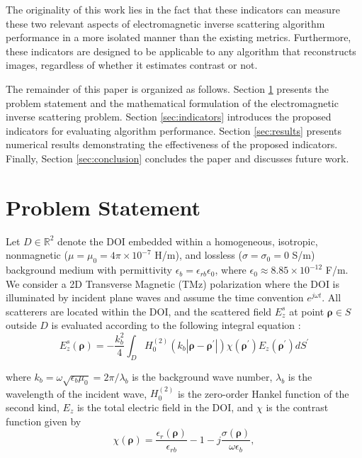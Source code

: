 \documentclass{IEEEtran}
\newcommand{\brho}{\boldsymbol{\rho}}
\newcommand{\brhop}{\boldsymbol{\rho^\prime}}
\begin{document}
        The originality of this work lies in the fact that these indicators can measure these two relevant aspects of electromagnetic inverse scattering algorithm performance in a more isolated manner than the existing metrics. Furthermore, these indicators are designed to be applicable to any algorithm that reconstructs images, regardless of whether it estimates contrast or not.

        The remainder of this paper is organized as follows. Section \ref{sec:problemstatement} presents the problem statement and the mathematical formulation of the electromagnetic inverse scattering problem. Section \ref{sec:indicators} introduces the proposed indicators for evaluating algorithm performance. Section \ref{sec:results} presents numerical results demonstrating the effectiveness of the proposed indicators. Finally, Section \ref{sec:conclusion} concludes the paper and discusses future work.
        
	\section{Problem Statement}\label{sec:problemstatement}
		
		Let $D \in \mathbb{R}^2$ denote the DOI embedded within a homogeneous, isotropic, nonmagnetic ($\mu = \mu_0 = 4\pi \times 10^{-7}$ H/m), and lossless ($\sigma = \sigma_0 = 0$ S/m) background medium with permittivity $\epsilon_b = \epsilon_{rb}\epsilon_0$, where $\epsilon_0 \approx 8.85 \times 10^{-12}$ F/m. We consider a 2D Transverse Magnetic (TMz) polarization where the DOI is illuminated by incident plane waves and assume the time convention $e^{j\omega t}$. All scatterers are located within the DOI, and the scattered field $E^s_z$ at point $\brho \in S$ outside $D$ is evaluated according to the following integral equation \cite{harrington2001time}:
		\begin{equation}
			E^s_z (\brho) = -\frac{k_b^2}{4} \int_D H_0^{(2)}(k_b|\brho-\brhop|)\chi(\brhop)E_z(\brhop) dS^\prime
		\end{equation}
		
		\noindent where $k_b = \omega\sqrt{\epsilon_b\mu_0} = 2\pi/\lambda_b$ is the background wave number, $\lambda_b$ is the wavelength of the incident wave, $H_0^{(2)}$ is the zero-order Hankel function of the second kind, $E_z$ is the total electric field in the DOI, and $\chi$ is the contrast function given by
		\begin{equation}
			\chi(\brho) = \frac{\epsilon_r(\brho)}{\epsilon_{rb}} - 1 - j\frac{\sigma(\brho)}{\omega\epsilon_b},
		\end{equation}
		
\end{document}
